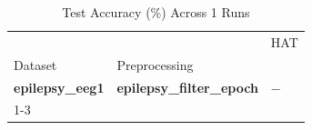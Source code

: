 \begin{table}
\caption{Test Accuracy (\%) Across 1 Runs}
\label{tab:results_acc}
\begin{tabular}{lll}
\toprule
 &  & HAT \\
Dataset & Preprocessing &  \\
\midrule
\textbf{epilepsy_eeg1} & \textbf{epilepsy_filter_epoch} & $-$ \\
\cline{1-3}
\bottomrule
\end{tabular}
\end{table}
